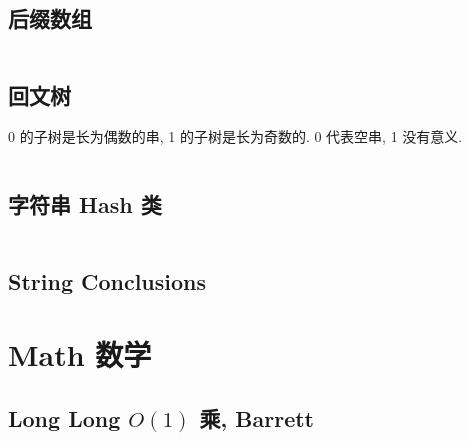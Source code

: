 \documentclass[titlepage, a4paper]{article}
\begin{document}
\begin{multicols}{2}
\begin{spacing}{0.6}
				\subsection{后缀数组}
					\inputminted{cpp}{src/String/SA.cpp}
				\subsection{回文树}
					0 的子树是长为偶数的串, 1 的子树是长为奇数的. 0 代表空串, 1 没有意义.
					\inputminted{cpp}{src/String/PAM.cpp}
				\subsection{字符串 Hash 类}
				\texttt{}
				\inputminted[highlightlines={6}]{cpp}{src/String/hash.cpp}	
				\subsection{String Conclusions}
					
			\newpage
			\section{Math 数学}
				\subsection{Long Long $O(1)$ 乘, Barrett}
					\inputminted{cpp}{src/Miscellany/LLFPM.cpp}

\end{spacing}
\end{multicols}
\end{document}
